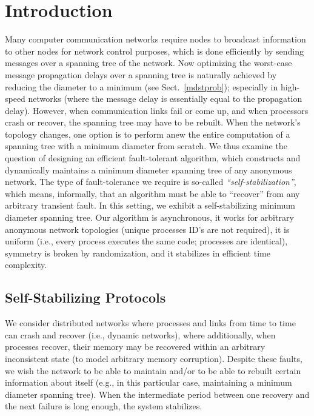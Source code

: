 \documentclass[10pt]{article}
\begin{document}
\section{Introduction}\label{intro}
Many computer communication networks require nodes to broadcast
information to other nodes for network control purposes, which is done
efficiently by sending messages over a spanning tree of the network.
Now optimizing the worst-case message propagation delays over a
spanning tree is naturally achieved by reducing the diameter to a
minimum (see Sect.~\ref{mdstprob}); especially in high-speed
networks (where the message delay is essentially equal to the
propagation delay). However, when communication links fail or come up,
and when processors crash or recover, the spanning tree may have to
be rebuilt. When the network's topology changes, one option is to
perform anew the entire computation of a spanning tree with a minimum
diameter from scratch. We thus examine the question of designing an
efficient fault-tolerant algorithm, which constructs and dynamically
maintains a minimum diameter spanning tree of any anonymous
network. The type of fault-tolerance we require is so-called {\em
``self-stabilization''}, which means, informally, that an algorithm
must be able to ``recover'' from any arbitrary transient fault. In
this setting, we exhibit a self-stabilizing minimum diameter spanning
tree.  Our algorithm is asynchronous, it works for arbitrary anonymous
network topologies (unique processes ID's are not required), it is
uniform (i.e., every process executes the same code; processes are
identical), symmetry is broken by randomization, and it stabilizes in
efficient time complexity.

\subsection{Self-Stabilizing Protocols}\label{ssproto}
We consider distributed networks where processes and links from time
to time can crash and recover (i.e., dynamic networks), where
additionally, when processes recover, their memory may be recovered
within an arbitrary inconsistent state (to model arbitrary memory
corruption). Despite these faults, we wish the network to be able to
maintain and/or to be able to rebuilt certain information about itself
(e.g., in this particular case, maintaining a minimum diameter
spanning tree). When the intermediate period between one recovery and
the next failure is long enough, the system stabilizes.
\end{document}
